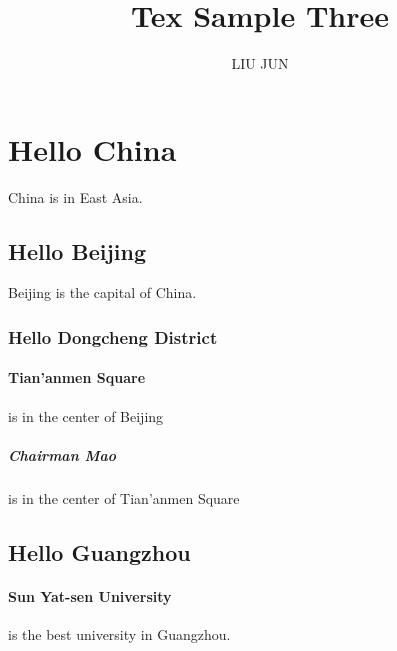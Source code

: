 \documentclass{article}
\author{LIU JUN}
\title{Tex Sample Three}
\begin{document}
\maketitle
\tableofcontents
\section{Hello China} China is in East Asia.
\subsection{Hello Beijing} Beijing is the capital of China.
\subsubsection{Hello Dongcheng District}
\paragraph{Tian'anmen Square}is in the center of Beijing
\subparagraph{Chairman Mao} is in the center of Tian'anmen Square
\subsection{Hello Guangzhou}
\paragraph{Sun Yat-sen University} is the best university in Guangzhou.
\end{document}
